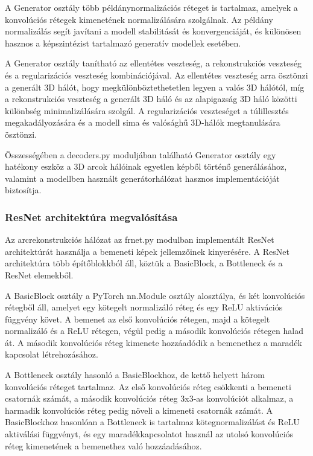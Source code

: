 \documentclass[12pt,a4]{article}
\begin{document}
 A Generator osztály több példánynormalizációs réteget is tartalmaz, amelyek a konvolúciós rétegek kimenetének normalizálására szolgálnak.
 Az példány normalizálás segít javítani a modell stabilitását és konvergenciáját, és különösen hasznos a képszintézist tartalmazó generatív modellek esetében.
 
 A Generator osztály tanítható az ellentétes veszteség, a rekonstrukciós veszteség és a regularizációs veszteség kombinációjával.
Az ellentétes veszteség arra ösztönzi a generált 3D hálót, hogy megkülönböztethetetlen legyen a valós 3D hálótól, míg a rekonstrukciós veszteség a generált 3D háló és az alapigazság 3D háló közötti különbség minimalizálására szolgál. 
 A regularizációs veszteséget a túlillesztés megakadályozására és a modell sima és valósághű 3D-hálók megtanulására ösztönzi.
 
 Összességében a decoders.py moduljában található Generator osztály egy hatékony eszköz a 3D arcok hálóinak egyetlen képből történő generálásához,
 valamint a modellben használt generátorhálózat hasznos implementációját biztosítja.

     \subsubsection{ResNet architektúra megvalósítása}
     Az arcrekonstrukciós hálózat az frnet.py modulban implementált ResNet architektúrát használja a bemeneti képek jellemzőinek kinyerésére. 
     A ResNet architektúra több építőblokkból áll, köztük a BasicBlock, a Bottleneck és a ResNet elemekből.

    A BasicBlock osztály a PyTorch nn.Module osztály alosztálya, és két konvolúciós rétegből áll, amelyet egy kötegelt normalizáló réteg és egy ReLU aktivációs függvény követ.
 A bemenet az első konvolúciós rétegen, majd a kötegelt normalizáló és a ReLU rétegen, végül pedig a második konvolúciós rétegen halad át. 
 A második konvolúciós réteg kimenete hozzáadódik a bemenethez a maradék kapcsolat létrehozásához.

A Bottleneck osztály hasonló a BasicBlockhoz, de kettő helyett három konvolúciós réteget tartalmaz.
 Az első konvolúciós réteg csökkenti a bemeneti csatornák számát, a második konvolúciós réteg 3x3-as konvolúciót alkalmaz, a harmadik konvolúciós réteg pedig növeli a kimeneti csatornák számát.
A BasicBlockhoz hasonlóan a Bottleneck is tartalmaz kötegnormalizálást és ReLU aktiválási függvényt, és egy maradékkapcsolatot használ az utolsó konvolúciós réteg kimenetének a bemenethez való hozzáadásához.
\end{document}
